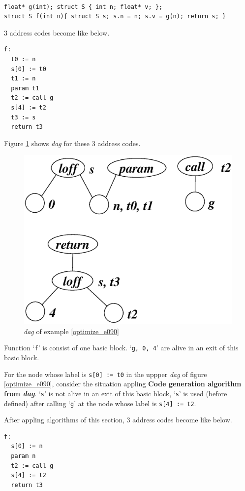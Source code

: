 \begin{Example}
\label{optimize_e091}
\begin{verbatim}

float* g(int); struct S { int n; float* v; };
struct S f(int n){ struct S s; s.n = n; s.v = g(n); return s; }
\end{verbatim}
3 address codes become like below.
\begin{verbatim}
f:
  t0 := n
  s[0] := t0
  t1 := n
  param t1
  t2 := call g
  s[4] := t2
  t3 := s
  return t3
\end{verbatim}
Figure \ref{optimize_e096} shows {\em dag} for these 3 address codes.
\begin{figure}[htbp]
\begin{center}
\includegraphics[width=0.8\linewidth,height=0.648\linewidth]{opt039.eps}
\caption{{\em dag} of example \ref{optimize_e090}}
\label{optimize_e096}
\end{center}
\end{figure}
Function `{\tt{f}}' is consist of one basic block.
`{\tt{g, 0, 4}}' are
alive in an exit of this basic block.

For the node whose label is {\tt{s[0] := t0}} in
the uppper {\em dag} of figure \ref{optimize_e090},
consider the situation appling
{\bf Code generation algorithm from {\em dag}}.
`{\tt{s}}' is not alive in an exit of this basic block,
`{\tt{s}}' is used (before defined) after calling `{\tt{g}}'
at the node whose label is {\tt{s[4] := t2}}.

After appling algorithms of this section,
3 address codes become like below.
\begin{verbatim}
f:
  s[0] := n
  param n
  t2 := call g
  s[4] := t2
  return t3
\end{verbatim}
\end{Example}

